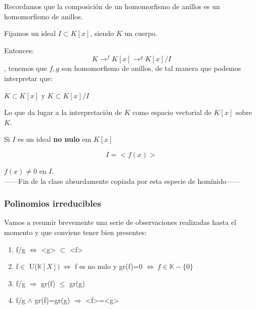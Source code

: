 \documentclass[nochap]{apuntes}
\begin{document}
Recordamos que la composición de un homomorfismo de anillos es un homomorfismo de anillos.

\begin{example}

Fijamos un ideal $I\subset K[x]$, siendo $K$ un cuerpo. 

Entonces:
\[K \to^f K[x] \to^g K[x]/I\], tenemos que $f,g$ son homomorfismo de anillos, de tal manera que podemos interpretar que:

$K\subset K[x]$ y $K\subset K[x]/I$

Lo que da lugar a la interpretación de $K$ como espacio vectorial de $K[x]$ sobre $K$.
\end{example}

Si $I$ es un ideal \textbf{no nulo} em $K[x]$

\[I = <f(x)>\]

$f(x) \neq 0$ en $I$.\\
------Fin de la clase absurdamente copiada por esta especie de homínido------

\subsubsection{Polinomios irreducibles}
Vamos a resumir brevemente una serie de observaciones realizadas hasta el momento y que conviene tener bien presentes:
\begin{enumerate}
 \item f/g $\Leftrightarrow$  <g> $\subset$  <f>
 \item f$\in$  U($\mathbb{K}[X]) \ \Leftrightarrow$  f es no nulo y gr(f)=0 $\Leftrightarrow \ f \in \mathbb{K}-\{0\}$
 \item f/g $\Rightarrow$  gr(f) $\leq$  gr(g)
 \item f/g $\wedge$  gr(f)=gr(g) $\Rightarrow$  <f>=<g>
\end{enumerate}
\end{document}
